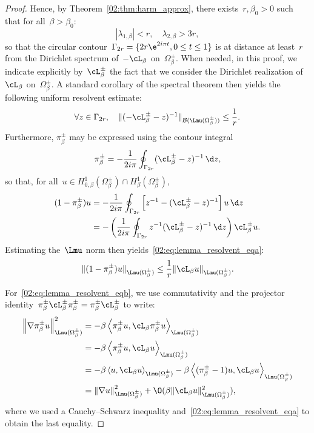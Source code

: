 \begin{proof}
            Hence, by Theorem~\ref{02:thm:harm_approx}, there exists~$r,\beta_0>0$ such that for all~$\beta>\beta_0$:
            \[|\lambda_{1,\beta}| <r,\quad \lambda_{2,\beta}>3r,\]
            so that the circular contour~$\Gamma_{2r} = \{2r\e^{2i\pi t}, 0\leq t \leq 1\}$ is at distance at least~$r$ from the Dirichlet spectrum of~$-\cL_\beta$ on~$\Omega_\beta^\pm$.
            When needed, in this proof, we indicate explicitly by~$\cL_\beta^\pm$ the fact that we consider the Dirichlet realization of~$\cL_\beta$ on~$\Omega_\beta^\pm$.\newline
            A standard corollary of the spectral theorem then yields the following uniform resolvent estimate:
            \[\forall z \in \Gamma_{2r},\quad\|(-\cL_\beta^\pm-z)^{-1}\|_{\mathcal B(\Lmu(\Omega_\beta^\pm))} \leq \frac 1r.\]
            Furthermore, $\pi_{\beta}^\pm$ may be expressed using the contour integral
            \begin{equation}
               \pi_\beta^\pm = -\frac{1}{2i\pi}\oint_{\Gamma_{2r}}(\cL_\beta^\pm-z)^{-1}\,\d z,
            \end{equation}
            so that, for all~$u\in H_{0,\beta}^1(\Omega_\beta^\pm)\cap H_\beta^1(\Omega_\beta^\pm)$,
            \begin{align*}
                (1-\pi^\pm_{\beta})u &= -\frac{1}{2i\pi}\oint_{\Gamma_{2r}} \left[z^{-1}-(\cL_\beta^\pm-z)^{-1}\right]u\,\d z\\
                &= -\left(\frac{1}{2i\pi}\oint_{\Gamma_{2r}}z^{-1}(\cL_\beta^\pm-z)^{-1}\,\d z\right)\cL_\beta^\pm u.
            \end{align*}
            Estimating the~$\Lmu$ norm then yields~\eqref{02:eq:lemma_resolvent_eqa}:
            \[\|(1-\pi^\pm_{\beta})u\|_{\Lmu(\Omega_\beta^\pm)} \leq \frac1r\|\cL_\beta u\|_{\Lmu(\Omega_\beta^\pm)}.
                \]

            For~\eqref{02:eq:lemma_resolvent_eqb}, we use commutativity and the projector identity~$\pi^\pm_{\beta}\cL_\beta^\pm\pi^\pm_{\beta} = \pi^\pm_{\beta}\cL_\beta^\pm$ to write:
            \begin{align*}
                \left\|\nabla \pi^\pm_{\beta}u\right\|^2_{\Lmu(\Omega_\beta^\pm)} &= -\beta\left\langle \pi^\pm_{\beta}u , \cL_\beta \pi^\pm_{\beta}u\right\rangle_{\Lmu(\Omega_\beta^\pm)}\\
                &= -\beta\left\langle \pi^\pm_{\beta}u,\cL_\beta u\right\rangle_{\Lmu(\Omega_\beta^\pm)}\\
                &=-\beta\left\langle u,\cL_\beta u\right\rangle_{\Lmu(\Omega_\beta^\pm)} - \beta\left\langle (\pi^\pm_{\beta}-1)u,\cL_\beta u\right\rangle_{\Lmu(\Omega_\beta^\pm)}\\
                &= \left\|\nabla u\right\|_{\Lmu(\Omega_\beta^\pm)}^2 + \O(\beta\|\cL_\beta u\|_{\Lmu(\Omega_\beta^\pm)}^2),
            \end{align*}
            where we used a Cauchy--Schwarz inequality and~\eqref{02:eq:lemma_resolvent_eqa} to obtain the last equality.
        \end{proof}
